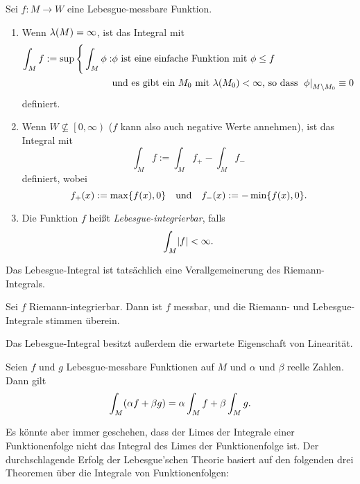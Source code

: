 \begin{definition}\label{definition:13}
	Sei \(f: M \to W\) eine Lebesgue-messbare Funktion.
	\begin{enumerate}
		\item Wenn \(\lambda\parentheses*{M} = \infty\), ist das Integral mit
		\begin{align*}
			\int_M f := \sup\Bigg\{\int_M \phi : &\phi\text{ ist eine einfache Funktion mit }\phi \le f\\
			&\text{und es gibt ein }M_0\text{ mit }\lambda\parentheses*{M_0} < \infty\text{, so dass }\left.\phi\right|_{M \setminus M_0} \equiv 0
		\end{align*}
		definiert.
		\item Wenn \(W \not\subseteq \left[0, \infty\right)\) (\(f\) kann also auch negative Werte annehmen), ist das Integral mit
		\[
			\int_M f := \int_M f_+ - \int_M f_-
		\]
		definiert, wobei
		\[
			f_+\parentheses*{x} := \max\braces*{f\parentheses*{x}, 0} \quad \text{und} \quad f_-\parentheses*{x} := -\min\braces*{f\parentheses*{x}, 0}.
		\]
		\item Die Funktion \(f\) heißt \emph{Lebesgue-integrierbar}, falls
		\[
			\int_M \absolute*{f} < \infty.
		\]
	\end{enumerate}
\end{definition}
Das Lebesgue-Integral ist tatsächlich eine Verallgemeinerung des Riemann-Integrals.

\begin{proposition}
	Sei \(f\) Riemann-integrierbar.
	Dann ist \(f\) messbar, und die Riemann- und Lebesgue-Integrale stimmen überein.
\end{proposition}

Das Lebesgue-Integral besitzt außerdem die erwartete Eigenschaft von Linearität.

\begin{proposition}\label{prop:1-15}
	Seien \(f\) und \(g\) Lebesgue-messbare Funktionen auf \(M\) und \(\alpha\) und \(\beta\) reelle Zahlen.
	Dann gilt
	\begin{equation}
		\int_M \parentheses*{\alpha f + \beta g} = \alpha\int_M f + \beta\int_M g.
	\end{equation}
\end{proposition}

Es könnte aber immer geschehen, dass der Limes der Integrale einer Funktionenfolge nicht das Integral des Limes der Funktionenfolge ist.
Der durchschlagende Erfolg der Lebesgue'schen Theorie basiert auf den folgenden drei Theoremen über die Integrale von Funktionenfolgen:

